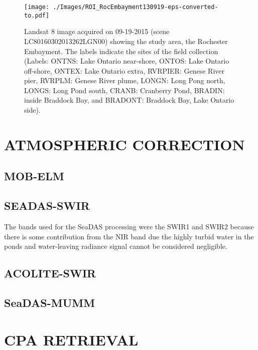 \documentclass[draft]{spie}  %
\begin{document}
\begin{figure}[htbp!]
  \centering
  \texttt{[image: ./Images/ROI\_RocEmbayment130919-eps-converted-to.pdf]}
  \caption{Landsat 8 image acquired on 09-19-2015 (scene LC80160302013262LGN00) showing the study area, the Rochester Embayment. The labels indicate the sites of the field collection (Labels: ONTNS: Lake Ontario near-shore, ONTOS: Lake Ontario off-shore, ONTEX: Lake Ontario extra, RVRPIER: Genese River pier, RVRPLM: Genese River plume, LONGN: Long Pong north, LONGS: Long Pond south, CRANB: Cranberry Pond, BRADIN: inside Braddock Bay, and BRADONT: Braddock Bay, Lake Ontario side).\label{fig:RrsROIs130919} } 
\end{figure}

\section{ATMOSPHERIC CORRECTION}
\label{sec:atmcorr}  %
\subsection{MOB-ELM}
\subsection{SEADAS-SWIR}
The bands used for the SeaDAS processing were the SWIR1 and SWIR2 because there is some contribution from the NIR band due the highly turbid water in the ponds and water-leaving radiance signal cannot be considered negligible.
\subsection{ACOLITE-SWIR}
\subsection{SeaDAS-MUMM}


\section{CPA RETRIEVAL}
\end{document}
